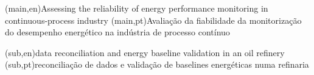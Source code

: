 
%




%
%
%
%
\nttitle(main,en){Assessing the reliability of energy performance monitoring in continuous-process industry}%
\nttitle(main,pt){Avaliação da fiabilidade da monitorização do desempenho energético na indústria de processo contínuo}%

\nttitle(sub,en){data reconciliation and energy baseline validation in an oil refinery}%
\nttitle(sub,pt){reconciliação de dados e validação de baselines energéticas numa refinaria}%
%
%
%
%



